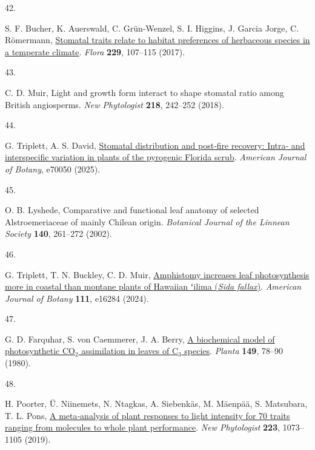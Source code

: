 \documentclass[
  letterpaper,
  DIV=11,
  numbers=noendperiod]{scrartcl}
\newlength{\cslhangindent}
\newlength{\csllabelwidth}
\newenvironment{CSLReferences}[2] %
 {\begin{list}{}{%
  \setlength{\itemindent}{0pt}
  \setlength{\leftmargin}{0pt}
  \setlength{\parsep}{0pt}
  \ifodd #1
   \setlength{\leftmargin}{\cslhangindent}
   \setlength{\itemindent}{-1\cslhangindent}
  \fi
  \setlength{\itemsep}{#2\baselineskip}}}
 {\end{list}}
\newcommand{\CSLLeftMargin}[1]{\parbox[t]{\csllabelwidth}{\strut#1\strut}}
\newcommand{\CSLRightInline}[1]{\parbox[t]{\linewidth - \csllabelwidth}{\strut#1\strut}}
\begin{document}
\begin{CSLReferences}{0}{1}
\CSLLeftMargin{42. }%
\CSLRightInline{S. F. Bucher, K. Auerswald, C. Grün-Wenzel, S. I.
Higgins, J. Garcia Jorge, C. Römermann,
\href{https://doi.org/10.1016/j.flora.2017.02.011}{Stomatal traits
relate to habitat preferences of herbaceous species in a temperate
climate}. \emph{Flora} \textbf{229}, 107--115 (2017).}

\CSLLeftMargin{43. }%
\CSLRightInline{C. D. Muir, Light and growth form interact to shape
stomatal ratio among {British} angiosperms. \emph{New Phytologist}
\textbf{218}, 242--252 (2018).}

\CSLLeftMargin{44. }%
\CSLRightInline{G. Triplett, A. S. David,
\href{https://doi.org/10.1002/ajb2.70050}{Stomatal distribution and
post‐fire recovery: {Intra}‐ and interspecific variation in plants of
the pyrogenic {Florida} scrub}. \emph{American Journal of Botany},
e70050 (2025).}

\CSLLeftMargin{45. }%
\CSLRightInline{O. B. Lyshede, Comparative and functional leaf anatomy
of selected {Alstroemeriaceae} of mainly {Chilean} origin.
\emph{Botanical Journal of the Linnean Society} \textbf{140}, 261--272
(2002).}

\CSLLeftMargin{46. }%
\CSLRightInline{G. Triplett, T. N. Buckley, C. D. Muir,
\href{https://doi.org/10.1002/ajb2.16284}{Amphistomy increases leaf
photosynthesis more in coastal than montane plants of {Hawaiian} ʻilima
(\emph{{Sida} fallax})}. \emph{American Journal of Botany} \textbf{111},
e16284 (2024).}

\CSLLeftMargin{47. }%
\CSLRightInline{G. D. Farquhar, S. von Caemmerer, J. A. Berry,
\href{https://doi.org/10.1007/BF00386231}{A biochemical model of
photosynthetic {CO}\(_{\textrm{2}}\) assimilation in leaves of
{C}\(_{\textrm{3}}\) species}. \emph{Planta} \textbf{149}, 78--90
(1980).}

\CSLLeftMargin{48. }%
\CSLRightInline{H. Poorter, Ü. Niinemets, N. Ntagkas, A. Siebenkäs, M.
Mäenpää, S. Matsubara, T. L. Pons,
\href{https://doi.org/10.1111/nph.15754}{A meta‐analysis of plant
responses to light intensity for 70 traits ranging from molecules to
whole plant performance}. \emph{New Phytologist} \textbf{223},
1073--1105 (2019).}


\end{CSLReferences}
\end{document}
